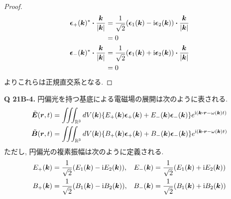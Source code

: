 \documentclass[uplatex,a4paper,dvipdfmx]{jsarticle}
\theoremstyle{definition}
\begin{document}
\begin{proof}
\begin{align}
    \ee_+(\kk)^*\vdot\frac{\kk}{|\kk|}                     & = \frac{1}{\sqrt{2}}(\ee_1(\kk) - \ii\ee_2(\kk))\vdot\frac{\kk}{|\kk|}     \\
                                                           & = 0                                                                        \\
    \ee_-(\kk)^*\vdot\frac{\kk}{|\kk|}                     & = \frac{1}{\sqrt{2}}(\ee_1(\kk) + \ii\ee_2(\kk))\vdot\frac{\kk}{|\kk|}     \\
                                                           & = 0
  \end{align}
  よりこれらは正規直交系となる.
\end{proof}

\textbf{Q 21B-4.} 円偏光を持つ基底による電磁場の展開は次のように表される.
\begin{align}
  \tilde{\EE}(\rr, t) & = \iiint_{\RR^3} dV(\kk)\qty{E_+(\kk)\ee_+(\kk) + E_-(\kk)\ee_-(\kk)}e^{\ii(\kk\vdot\rr - \omega(\kk)t)} \\
  \tilde{\BB}(\rr, t) & = \iiint_{\RR^3} dV(\kk)\qty{B_+(\kk)\ee_+(\kk) + B_-(\kk)\ee_-(\kk)}e^{\ii(\kk\vdot\rr - \omega(\kk)t)}
\end{align}
ただし, 円偏光の複素振幅は次のように定義される.
\begin{align}
  E_+(\vb*{k}) & = \frac{1}{\sqrt{2}}\qty(E_1(\vb*{k}) - \mathrm{i} E_2(\vb*{k})), & E_-(\vb*{k}) & = \frac{1}{\sqrt{2}}\qty(E_1(\vb*{k}) + \mathrm{i} E_2(\vb*{k})) \\
  B_+(\vb*{k}) & = \frac{1}{\sqrt{2}}\qty(B_1(\vb*{k}) - \mathrm{i} B_2(\vb*{k})), & B_-(\vb*{k}) & = \frac{1}{\sqrt{2}}\qty(B_1(\vb*{k}) + \mathrm{i} B_2(\vb*{k}))
\end{align}
\end{document}
